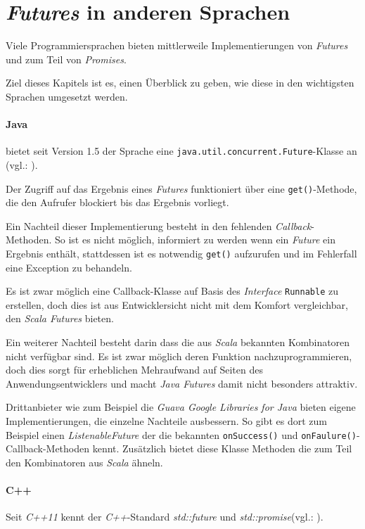 \section{\emph{Futures} in anderen Sprachen}

Viele Programmiersprachen bieten mittlerweile Implementierungen von
\emph{Futures} und zum Teil von \emph{Promises}.

Ziel dieses Kapitels ist es, einen Überblick zu geben, wie diese
in den wichtigsten Sprachen umgesetzt werden.

\paragraph{Java} bietet seit Version 1.5 der Sprache eine 
\texttt{java.util.concurrent.Future}-Klasse an (vgl.: \cite{javadocfuture}).

Der Zugriff auf das Ergebnis eines \emph{Futures} funktioniert über
eine \texttt{get()}-Methode, die den Aufrufer blockiert bis das
Ergebnis vorliegt.

Ein Nachteil dieser Implementierung besteht in den fehlenden
\emph{Callback}-Methoden. So ist es nicht möglich, informiert
zu werden wenn ein \emph{Future} ein Ergebnis enthält, stattdessen
ist es notwendig \texttt{get()} aufzurufen und im Fehlerfall
eine Exception zu behandeln.

Es ist zwar möglich eine Callback-Klasse auf Basis des \emph{Interface}
\texttt{Runnable} zu erstellen, doch dies ist aus Entwicklersicht
nicht mit dem Komfort vergleichbar, den \emph{Scala Futures} bieten.

Ein weiterer Nachteil besteht darin dass die aus \emph{Scala} bekannten
Kombinatoren nicht verfügbar sind. Es ist zwar möglich deren Funktion
nachzuprogrammieren, doch dies sorgt für erheblichen Mehraufwand
auf Seiten des Anwendungsentwicklers und macht \emph{Java Futures}
damit nicht besonders attraktiv.

Drittanbieter wie zum Beispiel die \emph{Guava Google Libraries for Java}
bieten eigene Implementierungen, die einzelne Nachteile ausbessern.
So gibt es dort zum Beispiel einen \emph{ListenableFuture} der die
bekannten \texttt{onSuccess()} und \texttt{onFaulure()}-Callback-Methoden
kennt. Zusätzlich bietet diese Klasse Methoden die zum Teil den
Kombinatoren aus \emph{Scala} ähneln.

\paragraph{C++} Seit \emph{C++11} kennt der \emph{C++}-Standard
\emph{std::future} und \emph{std::promise}(vgl.: \cite{cpp11FAQ}).

